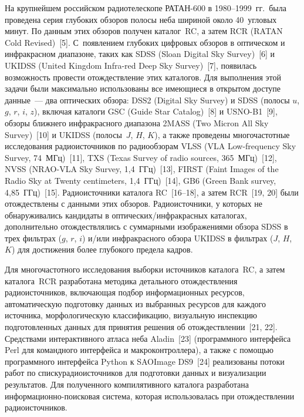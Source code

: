 \begin{multicols}{2}
      На крупнейшем российском радиотелескопе РАТАН-600 в 1980--1999~гг.\ была 
проведена серия глубоких обзоров полосы неба шириной около 40~угловых минут. По 
данным этих обзоров получен каталог~RC, а затем RCR ({RATAN Cold 
Revised})~[5]. С~появлением глубоких цифровых обзоров в оптическом и инфракрасном 
диапазоне, таких как SDSS ({Sloan Digital Sky Survey})~[6] и UKIDSS ({United 
Kingdom Infra-red Deep Sky Survey})~[7], появилась возможность провести отождествление 
этих каталогов. Для выполнения этой задачи были максимально использованы все 
имеющиеся в открытом доступе данные~--- два оптических обзора: DSS2 ({Digital 
Sky Survey}) и SDSS (полосы $u$, $g$, $r$, $i$, $z$), включая каталоги GSC ({Guide 
Star Catalog})~[8] и USNO-B1~[9], обзоры ближнего инфракрасного диапазона 2MASS 
({Two Micron All Sky Survey})~[10] и UKIDSS (полосы~$J$, $H$, $K$), а также 
проведены многочастотные исследования радиоисточников по радиообзорам VLSS 
({VLA Low-frequency Sky Survey}, 74~МГц)~[11], TXS ({Texas Survey of radio 
sources}, 365~МГц)~[12], NVSS ({NRAO-VLA Sky Survey}, 1,4~ГГц)~[13], FIRST 
({Faint Images of the Radio Sky at Twenty centimeters}, 1,4~ГГц)~[14], GB6 
({Green Bank survey}, 4,85~ГГц)~[15]. Радиоисточники каталога RC~[16--18], а затем 
RCR~[19, 20] были отождествлены с данными этих обзоров. Радиоисточники, у которых не 
обнаруживались кандидаты в оптических/инфракрасных каталогах, дополнительно 
отождествлялись с суммарными изображениями обзора SDSS в трех фильтрах ($g$, $r$, 
$i$) и/или инфракрасного обзора UKIDSS в фильтрах ($J$, $H$, $K$) для достижения 
более глубокого предела кадров. 
      
      Для многочастотного исследования выборки источни\-ков каталога~RC, а затем 
каталога~RCR разработана методика детального отождествления радиоис\-точников, 
включающая подбор информационных ресурсов, автоматическую подготовку данных из 
выбранных ресурсов для каждого источника, морфологическую классификацию, визуальную 
инспекцию подготовленных данных для принятия решения об отождествлении~[21, 22]. 
Средствами интерактивного атласа неба Aladin~[23] (программного интерфейса Perl для 
командного интерфейса и макроконтроллера), а также с по\-мощью программного интерфейса 
Python к SAOImage DS9~[24] реализованы потоки работ по списку\linebreak радиоисточников для 
подготовки данных и визуализации результатов. Для полученного компилятивного каталога 
разработана ин\-фор\-ма\-ци\-он\-но-по\-иско\-вая сис\-те\-ма, которая использовалась при\linebreak 
отождествлении радиоисточников. 


\end{multicols}
